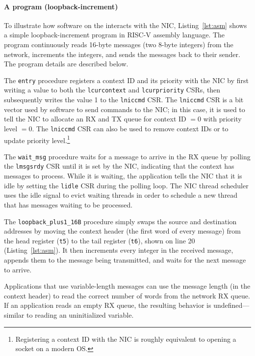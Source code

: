 \paragraph{A \name{} program (loopback-increment)}
To illustrate how software on the \name{} interacts with the NIC, Listing~\ref{lst:asm} shows a simple loopback-increment program in RISC-V assembly language.
The program continuously reads 16-byte messages (two 8-byte integers) from the network, increments the integers, and sends the messages back to their sender.
The program details are described below.

The \verb|entry| procedure registers a context ID and its priority with the NIC by first writing a value to both the \verb|lcurcontext| and \verb|lcurpriority| CSRs, then subsequently writes the value 1 to the \verb|lniccmd| CSR.
The \verb|lniccmd| CSR is a bit vector used by software to send commands to the NIC; in this case, it is used to tell the NIC to allocate an RX and TX queue for context ID $=0$ with priority level $=0$.
The \verb|lniccmd| CSR can also be used to remove context IDs or to update priority level.\footnote{Registering a context ID with the NIC is roughly equivalent to opening a socket on a modern OS.}

The \verb|wait_msg| procedure waits for a message to arrive in the RX queue by polling the \verb|lmsgsrdy| CSR until it is set by the NIC, indicating that the context has messages to process.
While it is waiting, the application tells the NIC that it is idle by setting the \verb|lidle| CSR during the polling loop.
The NIC thread scheduler uses the idle signal to evict waiting threads in order to schedule a new thread that has messages waiting to be processed.

The \verb|loopback_plus1_16B| procedure simply swaps the source and destination addresses by moving the context header (the first word of every message) from the head register (\verb|t5|) to the tail register (\verb|t6|), shown on line 20 (Listing~\ref{lst:asm}). 
It then increments every integer in the received message, appends them to the message being transmitted, and waits for the next message to arrive.

Applications that use variable-length messages can use the message length (in the context header) to read the correct number of words from the network RX queue.
If an application reads an empty RX queue, the resulting behavior is undefined---similar to reading an uninitialized variable.
